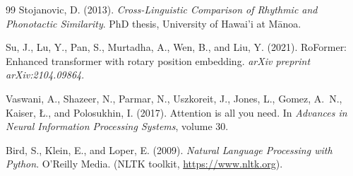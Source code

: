 \documentclass[11pt]{article}
\begin{document}
\begin{thebibliography}{99}
Stojanovic, D. (2013).
\newblock \emph{Cross-Linguistic Comparison of Rhythmic and Phonotactic Similarity}.
\newblock PhD thesis, University of Hawai'i at M\=anoa.

Su, J., Lu, Y., Pan, S., Murtadha, A., Wen, B., and Liu, Y. (2021).
\newblock RoFormer: Enhanced transformer with rotary position embedding.
\newblock \emph{arXiv preprint arXiv:2104.09864}.

Vaswani, A., Shazeer, N., Parmar, N., Uszkoreit, J., Jones, L., Gomez, A.~N., Kaiser, {\L}., and Polosukhin, I. (2017).
\newblock Attention is all you need.
\newblock In \emph{Advances in Neural Information Processing Systems}, volume 30.

Bird, S., Klein, E., and Loper, E. (2009).
\newblock \emph{Natural Language Processing with Python}.
\newblock O'Reilly Media. (NLTK toolkit, \url{https://www.nltk.org}).

\end{thebibliography}
\end{document}
